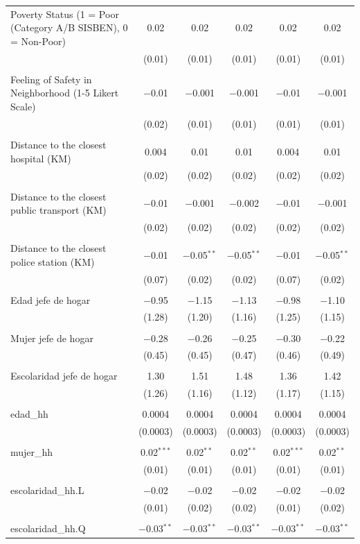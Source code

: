 \begin{table}[H]
\begin{tabularx}{0.9\textwidth}{@{\extracolsep{-7pt}}lccccc}
 Poverty Status (1 = Poor (Category A/B SISBEN), 0 = Non-Poor) & 0.02 & 0.02 & 0.02 & 0.02 & 0.02 \\    & (0.01) & (0.01) & (0.01) & (0.01) & (0.01) \\    & & & & & \\   Feeling of Safety in Neighborhood (1-5 Likert Scale) & $-$0.01 & $-$0.001 & $-$0.001 & $-$0.01 & $-$0.001 \\    & (0.02) & (0.01) & (0.01) & (0.01) & (0.01) \\    & & & & & \\   Distance to the closest hospital (KM) & 0.004 & 0.01 & 0.01 & 0.004 & 0.01 \\    & (0.02) & (0.02) & (0.02) & (0.02) & (0.02) \\    & & & & & \\   Distance to the closest public transport  (KM) & $-$0.01 & $-$0.001 & $-$0.002 & $-$0.01 & $-$0.001 \\    & (0.02) & (0.02) & (0.02) & (0.02) & (0.02) \\    & & & & & \\   Distance to the closest police station (KM) & $-$0.01 & $-$0.05$^{**}$ & $-$0.05$^{**}$ & $-$0.01 & $-$0.05$^{**}$ \\    & (0.07) & (0.02) & (0.02) & (0.07) & (0.02) \\    & & & & & \\   Edad jefe de hogar & $-$0.95 & $-$1.15 & $-$1.13 & $-$0.98 & $-$1.10 \\    & (1.28) & (1.20) & (1.16) & (1.25) & (1.15) \\    & & & & & \\   Mujer jefe de hogar & $-$0.28 & $-$0.26 & $-$0.25 & $-$0.30 & $-$0.22 \\    & (0.45) & (0.45) & (0.47) & (0.46) & (0.49) \\    & & & & & \\   Escolaridad jefe de hogar & 1.30 & 1.51 & 1.48 & 1.36 & 1.42 \\    & (1.26) & (1.16) & (1.12) & (1.17) & (1.15) \\    & & & & & \\   edad\_hh & 0.0004 & 0.0004 & 0.0004 & 0.0004 & 0.0004 \\    & (0.0003) & (0.0003) & (0.0003) & (0.0003) & (0.0003) \\    & & & & & \\   mujer\_hh & 0.02$^{***}$ & 0.02$^{**}$ & 0.02$^{**}$ & 0.02$^{***}$ & 0.02$^{**}$ \\    & (0.01) & (0.01) & (0.01) & (0.01) & (0.01) \\    & & & & & \\   escolaridad\_hh.L & $-$0.02 & $-$0.02 & $-$0.02 & $-$0.02 & $-$0.02 \\    & (0.01) & (0.02) & (0.02) & (0.01) & (0.02) \\    & & & & & \\   escolaridad\_hh.Q & $-$0.03$^{**}$ & $-$0.03$^{**}$ & $-$0.03$^{**}$ & $-$0.03$^{**}$ & $-$0.03$^{**}$ \\   
\end{tabularx}
\end{table}
